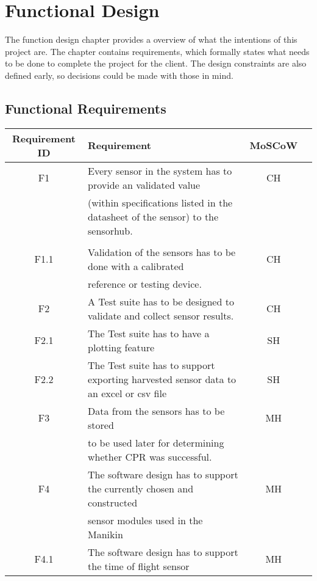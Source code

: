 \chapter{Functional Design}
\label{chapter:requirements} 
The function design chapter provides a overview of what the intentions of this project are.
The chapter contains requirements, which formally states what needs to be done to complete the project for the client. The design constraints are also defined early, so decisions could be made with those in mind.

\section{Functional Requirements}
\begin{table}[hb!]
\begin{tabular}{ |c|l|c|c| } 
 \hline
 Requirement ID & Requirement & MoSCoW \\ 
 \hline
 \hline
 F1    & Every sensor in the system has to provide an validated value  & CH \\ 
       & (within specifications listed in the datasheet of the sensor) to the sensorhub.  &  \\
       &                                                                                  &  \\
\hline
 F1.1  & Validation of the sensors has to be done with a calibrated                       & CH \\
       & reference or testing device.                                                     &   \\
\hline
 F2    & A Test suite has to be designed to validate and collect sensor results.          & CH \\
 \hline
 F2.1  & The Test suite has to have a plotting feature                                    & SH \\
 \hline 
 F2.2  & The Test suite has to support exporting harvested sensor data to an excel or csv file & SH \\
 \hline
 F3    & Data from the sensors has to be stored & MH\\
       & to be used later for determining whether CPR was successful.  & \\
\hline
 F4    & The software design has to support the currently chosen and constructed & MH  \\
       & sensor modules used in the Manikin & \\
 \hline
 F4.1  & The software design has to support the time of flight sensor & MH \\

\end{tabular}
\end{table}
